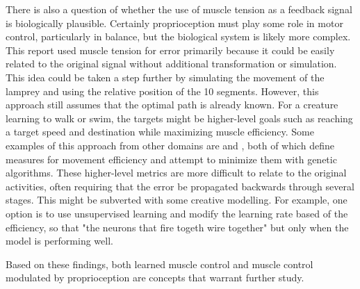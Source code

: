 \documentclass[12pt]{article}
\begin{document}
There is also a question of whether the use of muscle tension as a feedback signal is biologically plausible. Certainly proprioception must play some role in motor control, particularly in balance, but the biological system is likely more complex. This report used muscle tension for error primarily because it could be easily related to the original signal without additional transformation or simulation. This idea could be taken a step further by simulating the movement of the lamprey and using the relative position of the 10 segments. However, this approach still assumes that the optimal path is already known. For a creature learning to walk or swim, the targets might be higher-level goals such as reaching a target speed and destination while maximizing muscle efficiency. Some examples of this approach from other domains are \cite{ga1} and \cite{ga2}, both of which define measures for movement efficiency and attempt to minimize them with genetic algorithms. These higher-level metrics are more difficult to relate to the original activities, often requiring that the error be propagated backwards through several stages. This might be subverted with some creative modelling. For example, one option is to use unsupervised learning and modify the learning rate based of the efficiency, so that "the neurons that fire togeth wire together" but only when the model is performing well.

Based on these findings, both learned muscle control and muscle control modulated by proprioception are concepts that warrant further study.

\newpage
\onehalfspacing



\newpage
{}

\singlespacing
\end{document}
